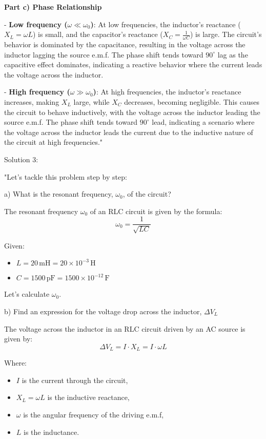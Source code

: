 \textbf{Part c) Phase Relationship}

- \textbf{Low frequency (\( \omega \ll \omega_{0} \))}: At low frequencies, the inductor's reactance (\(X_{L} = \omega L\)) is small, and the capacitor's reactance (\(X_{C} = \frac{1}{\omega C}\)) is large. The circuit's behavior is dominated by the capacitance, resulting in the voltage across the inductor lagging the source e.m.f. The phase shift tends toward \(90^\circ\) lag as the capacitive effect dominates, indicating a reactive behavior where the current leads the voltage across the inductor.

- \textbf{High frequency (\( \omega \gg \omega_{0} \))}: At high frequencies, the inductor's reactance increases, making \(X_{L}\) large, while \(X_{C}\) decreases, becoming negligible. This causes the circuit to behave inductively, with the voltage across the inductor leading the source e.m.f. The phase shift tends toward \(90^\circ\) lead, indicating a scenario where the voltage across the inductor leads the current due to the inductive nature of the circuit at high frequencies."

Solution 3:

"Let's tackle this problem step by step:

a) What is the resonant frequency, \( \omega_{0} \), of the circuit?

The resonant frequency \( \omega_{0} \) of an RLC circuit is given by the formula:
\[ \omega_{0} = \frac{1}{\sqrt{LC}} \]

Given:
\begin{itemize}
    \item \( L = 20 \, \text{mH} = 20 \times 10^{-3} \, \text{H} \)
    \item \( C = 1500 \, \text{pF} = 1500 \times 10^{-12} \, \text{F} \)
\end{itemize}

Let's calculate \( \omega_{0} \).

b) Find an expression for the voltage drop across the inductor, \( \Delta V_{L} \)

The voltage across the inductor in an RLC circuit driven by an AC source is given by:
\[ \Delta V_{L} = I \cdot X_{L} = I \cdot \omega L \]

Where:
\begin{itemize}
    \item \( I \) is the current through the circuit,
    \item \( X_{L} = \omega L \) is the inductive reactance,
    \item \( \omega \) is the angular frequency of the driving e.m.f,
    \item \( L \) is the inductance.
\end{itemize}

